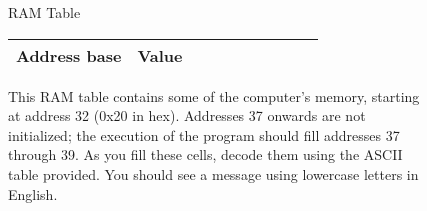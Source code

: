 \documentclass[11pt]{article}
\begin{document}
\begin{figure}[h]
  \centering
  RAM Table
  
  \begin{tabular}{|c|c|c|c|c|c|c|c|c|c|}
    \hline
    \textbf{Address base} & Value
    \\ \hline
    
  \end{tabular}
  \caption{%
    This RAM table contains some of the computer's memory, starting at address
    32 (0x20 in hex).
    Addresses 37 onwards are not initialized; the execution of
    the program should fill addresses 37 through 39.
    As you fill these cells, decode them using the ASCII table provided. You
    should see a message using lowercase letters in English.
  }
\end{figure}
\end{document}
